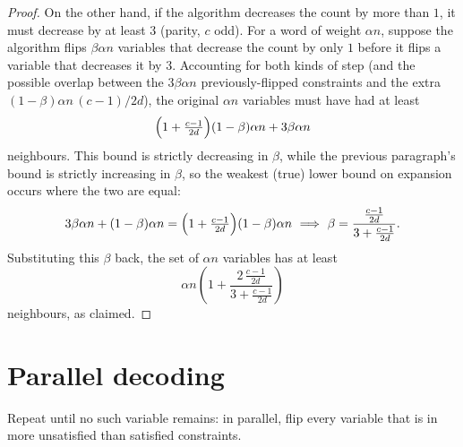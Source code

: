 \begin{proof}
  On the other hand, if the algorithm decreases the count by more than $1$, it
  must decrease by at least $3$ (parity, $c$ odd). For a word of weight
  $\alpha n$, suppose the algorithm flips $\beta\alpha n$ variables that
  decrease the count by only $1$ before it flips a variable that decreases it by
  $3$. Accounting for both kinds of step (and the possible overlap between the
  $3\beta\alpha n$ previously-flipped constraints and the extra
  $(1-\beta)\alpha n\,(c-1)/2d$), the original $\alpha n$ variables must have had
  at least
  \[
    \Bigl(1+\tfrac{c-1}{2d}\Bigr)(1-\beta)\alpha n
      + 3\beta\alpha n
  \]
  neighbours. This bound is strictly decreasing in $\beta$, while the previous
  paragraph's bound is strictly increasing in $\beta$, so the weakest (true)
  lower bound on expansion occurs where the two are equal:
  \[
    3\beta\alpha n + (1-\beta)\alpha n
      = \Bigl(1+\tfrac{c-1}{2d}\Bigr)(1-\beta)\alpha n
    \ \Longrightarrow\
    \beta = \frac{\frac{c-1}{2d}}{3+\frac{c-1}{2d}}.
  \]
  Substituting this $\beta$ back, the set of $\alpha n$ variables has at least
  \[
    \alpha n\!\left(1 + \frac{2\,\frac{c-1}{2d}}{3+\frac{c-1}{2d}}\right)
  \]
  neighbours, as claimed.
\end{proof}

\chapter{Parallel decoding}


\begin{definition}
  \label{def:parallel-decode}
  Repeat until no such variable remains: in parallel, flip every variable that
  is in more unsatisfied than satisfied constraints.
\end{definition}

